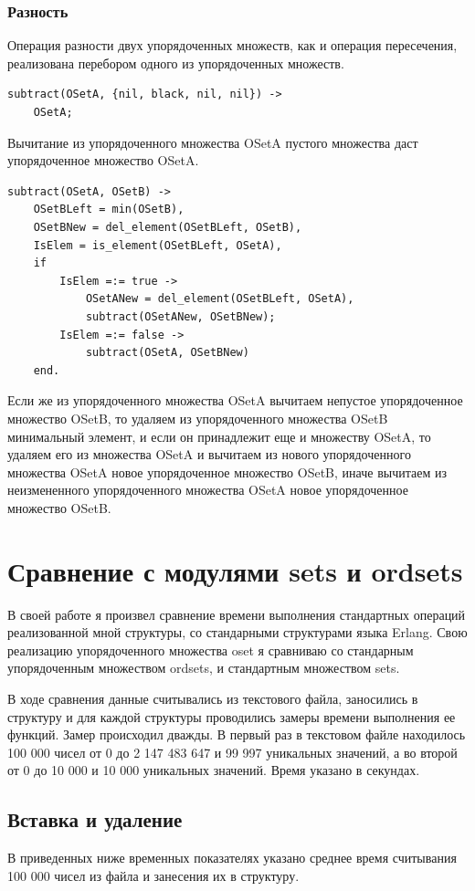 		\subsubsection{Разность}
			Операция разности двух упорядоченных множеств, как и операция пересечения, реализована 
			перебором одного из упорядоченных множеств.
			\begin{lstlisting}
subtract(OSetA, {nil, black, nil, nil}) ->
    OSetA;
			\end{lstlisting}
			Вычитание из упорядоченного множества OSetA пустого множества даст упорядоченное множество OSetA.
			\begin{lstlisting}
subtract(OSetA, OSetB) ->
    OSetBLeft = min(OSetB),
    OSetBNew = del_element(OSetBLeft, OSetB),
    IsElem = is_element(OSetBLeft, OSetA),
    if 
        IsElem =:= true -> 
            OSetANew = del_element(OSetBLeft, OSetA),
            subtract(OSetANew, OSetBNew);
        IsElem =:= false -> 
            subtract(OSetA, OSetBNew)
    end.	 	
			\end{lstlisting}
			Если же из упорядоченного множества OSetA вычитаем непустое упорядоченное множество OSetB,
			то удаляем из упорядоченного множества OSetB минимальный элемент, и если он 
			принадлежит еще и множеству OSetA, то удаляем его из множества OSetA и вычитаем из нового
			упорядоченного множества OSetA новое упорядоченное множество OSetB, иначе вычитаем из неизмененного
			упорядоченного множества OSetA новое упорядоченное множество OSetB.
			
			
			
			
\section{Сравнение с модулями sets и ordsets}
	В своей работе я произвел сравнение времени выполнения стандартных операций реализованной мной структуры, со 
	стандарными структурами языка Erlang. Свою реализацию упорядоченного множества oset я сравниваю со стандарным 
	упорядоченным множеством ordsets, и	стандартным множеством sets.
	
	В ходе сравнения данные считывались из текстового файла, заносились в структуру и для каждой структуры проводились
	замеры времени выполнения ее функций. Замер происходил дважды. В первый раз в текстовом файле находилось 100 000 чисел 
	от 0 до 2 147 483 647 и 99 997 уникальных значений, а во второй от 0 до 10 000 и 10 000 уникальных значений. Время 
	указано в секундах.
	
	\subsection{Вставка и удаление}
		В приведенных ниже временных показателях указано среднее время считывания 100 000 чисел из файла и занесения 
		их в структуру.
		

